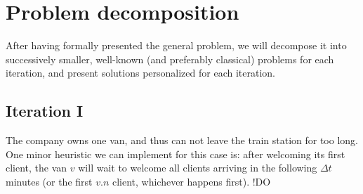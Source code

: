 \chapter{Problem decomposition}
After having formally presented the general problem, we will decompose it into successively smaller, well-known (and preferably classical) problems for each iteration, and present solutions personalized for each iteration.
\section{Iteration I}
The company owns one van, and thus can not leave the train station for too long. One minor heuristic we can implement for this case is: after welcoming its first client, the van $v$ will wait to welcome all clients arriving in the following $\Delta t$ minutes (or the first $v.n$ client, whichever happens first). !DO 
